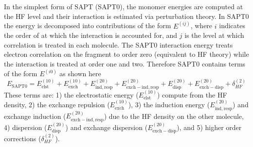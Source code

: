 \documentclass[../Main/chem371-notes.tex]{subfiles}
\begin{document}

In the simplest form of SAPT (SAPT0), the monomer energies are computed at the HF level and their interaction is estimated via perturbation theory.
In SAPT0 the energy is decomposed into contributions of the form $E^{(ij)}$, where $i$ indicates the order of at which the interaction is accounted for, and $j$ is the level at which correlation is treated in each molecule.
The SAPT0 interaction energy treats electron correlation on the fragment to order zero (equivalent to HF theory) while the interaction is treated at order one and two. Therefore SAPT0 contains terms of the form $E^{(i0)}$ as shown here
\begin{equation}
E_\mathrm{SAPT0} = E_\mathrm{elst}^{(10)} + E_\mathrm{exch}^{(10)} + E_\mathrm{ind,resp}^{(20)} +
E_\mathrm{exch-ind,resp}^{(20)} + E_\mathrm{disp}^{(20)} + E_\mathrm{exch-disp}^{(20)} + \delta_{HF}^{(2)}
\end{equation}
These terms are: 1) the electrostatic energy ($E_\mathrm{elst}^{(10)} $) compute from the HF density, 2) the exchange repulsion ($E_\mathrm{exch}^{(10)}$), 3) the induction energy ($E_\mathrm{ind,resp}^{(20)} $) and exchange induction ($E_\mathrm{exch-ind,resp}^{(20)}$) due to the HF density on the other molecule, 4) dispersion ($E_\mathrm{disp}^{(20)}$) and exchange dispersion ($E_\mathrm{exch-disp}^{(20)}$), and 5) higher order corrections ($\delta_{HF}^{(2)}$).
\end{document}
